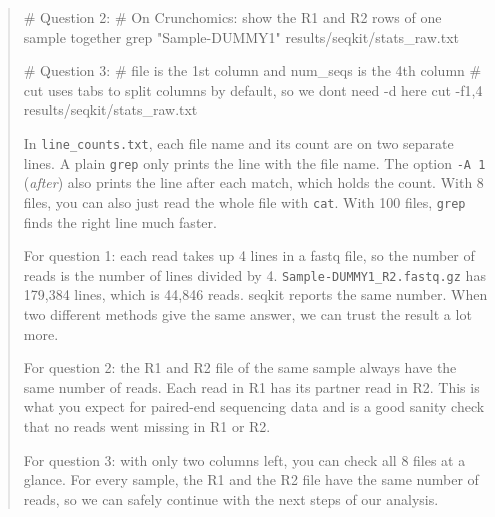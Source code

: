 \documentclass[
  letterpaper,
  DIV=11,
  numbers=noendperiod]{scrreprt}
\newenvironment{Shaded}{}{}
\newcommand{\AttributeTok}[1]{\textcolor[rgb]{0.84,0.23,0.29}{#1}}
\newcommand{\CommentTok}[1]{\textcolor[rgb]{0.42,0.45,0.49}{#1}}
\newcommand{\FunctionTok}[1]{\textcolor[rgb]{0.44,0.26,0.76}{#1}}
\newcommand{\NormalTok}[1]{\textcolor[rgb]{0.14,0.16,0.18}{#1}}
\newcommand{\StringTok}[1]{\textcolor[rgb]{0.01,0.18,0.38}{#1}}
\begin{document}
\begin{tcolorbox}
\begin{quote}
\begin{Shaded}
\begin{Highlighting}[]
\CommentTok{\# Question 2:}
\CommentTok{\# On Crunchomics: show the R1 and R2 rows of one sample together}
\FunctionTok{grep} \StringTok{"Sample{-}DUMMY1"}\NormalTok{ results/seqkit/stats\_raw.txt}

\CommentTok{\# Question 3:}
\CommentTok{\# file is the 1st column and num\_seqs is the 4th column}
\CommentTok{\# cut uses tabs to split columns by default, so we don\textquotesingle{}t need {-}d here}
\FunctionTok{cut} \AttributeTok{{-}f1,4}\NormalTok{ results/seqkit/stats\_raw.txt}
\end{Highlighting}
\end{Shaded}

In \texttt{line\_counts.txt}, each file name and its count are on two
separate lines. A plain \texttt{grep} only prints the line with the file
name. The option \texttt{-A\ 1} (\emph{after}) also prints the line
after each match, which holds the count. With 8 files, you can also just
read the whole file with \texttt{cat}. With 100 files, \texttt{grep}
finds the right line much faster.

For question 1: each read takes up 4 lines in a fastq file, so the
number of reads is the number of lines divided by 4.
\texttt{Sample-DUMMY1\_R2.fastq.gz} has 179,384 lines, which is 44,846
reads. seqkit reports the same number. When two different methods give
the same answer, we can trust the result a lot more.

For question 2: the R1 and R2 file of the same sample always have the
same number of reads. Each read in R1 has its partner read in R2. This
is what you expect for paired-end sequencing data and is a good sanity
check that no reads went missing in R1 or R2.

For question 3: with only two columns left, you can check all 8 files at
a glance. For every sample, the R1 and the R2 file have the same number
of reads, so we can safely continue with the next steps of our analysis.
\end{quote}

\end{tcolorbox}
\end{document}
